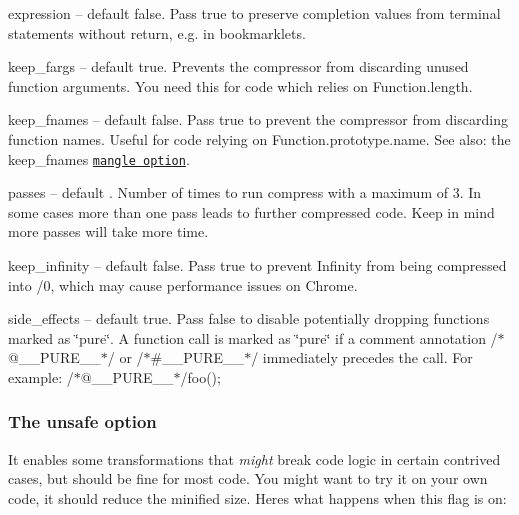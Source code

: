 \begin{DoxyItemize}
\item {\ttfamily expression} -- default {\ttfamily false}. Pass {\ttfamily true} to preserve completion values from terminal statements without {\ttfamily return}, e.\+g. in bookmarklets.
\item {\ttfamily keep\+\_\+fargs} -- default {\ttfamily true}. Prevents the compressor from discarding unused function arguments. You need this for code which relies on {\ttfamily Function.\+length}.
\item {\ttfamily keep\+\_\+fnames} -- default {\ttfamily false}. Pass {\ttfamily true} to prevent the compressor from discarding function names. Useful for code relying on {\ttfamily Function.\+prototype.\+name}. See also\+: the {\ttfamily keep\+\_\+fnames} \href{#mangle}{\tt mangle option}.
\item {\ttfamily passes} -- default {}. Number of times to run compress with a maximum of 3. In some cases more than one pass leads to further compressed code. Keep in mind more passes will take more time.
\item {\ttfamily keep\+\_\+infinity} -- default {\ttfamily false}. Pass {\ttfamily true} to prevent {\ttfamily Infinity} from being compressed into {/0}, which may cause performance issues on Chrome.
\item {\ttfamily side\+\_\+effects} -- default {\ttfamily true}. Pass {\ttfamily false} to disable potentially dropping functions marked as \char`\"{}pure\char`\"{}. A function call is marked as \char`\"{}pure\char`\"{} if a comment annotation {\ttfamily /$\ast$@\+\_\+\+\_\+\+P\+U\+R\+E\+\_\+\+\_\+$\ast$/} or {\ttfamily /$\ast$\#\+\_\+\+\_\+\+P\+U\+R\+E\+\_\+\+\_\+$\ast$/} immediately precedes the call. For example\+: {\ttfamily /$\ast$@\+\_\+\+\_\+\+P\+U\+R\+E\+\_\+\+\_\+$\ast$/foo();}
\end{DoxyItemize}

\subsubsection*{The {\ttfamily unsafe} option}

It enables some transformations that {\itshape might} break code logic in certain contrived cases, but should be fine for most code. You might want to try it on your own code, it should reduce the minified size. Here\textquotesingle{}s what happens when this flag is on\+:


